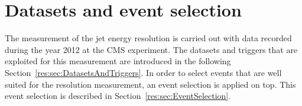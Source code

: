 \FloatBarrier
\chapter{Datasets and event selection}

The measurement of the jet energy resolution is carried out with \GAMJET data recorded during the year 2012 at the CMS experiment.
The datasets and triggers that are exploited for this measurement are introduced in the following Section~\ref{res:sec:DatasetsAndTriggers}.
In order to select \GAMJET events that are well suited for the resolution measurement, an event selection is applied on top. %
This event selection is described in Section~\ref{res:sec:EventSelection}.

